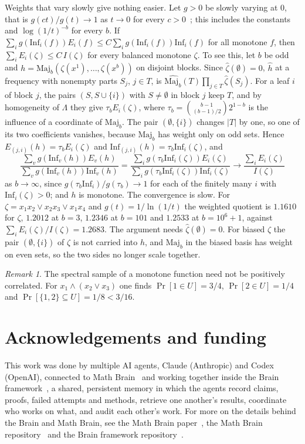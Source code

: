 \documentclass[11pt]{amsart}
\theoremstyle{definition}
\theoremstyle{remark}
\newtheorem{remark}[theorem]{Remark}
\newcommand{\Inf}{\mathrm{Inf}}
\begin{document}
Weights that vary slowly give nothing easier. Let $g>0$ be slowly varying at $0$, that is $g(ct)/g(t)\to1$ as $t\to0$
for every $c>0$~\cite{BGT}; this includes the constants and $\log(1/t)^{-b}$ for every $b$. If
$\sum_ig(\Inf_i(f))E_i(f)\le C\sum_ig(\Inf_i(f))\Inf_i(f)$ for all monotone $f$, then $\sum_iE_i(\zeta)\le C\,I(\zeta)$
for every balanced monotone $\zeta$. To see this, let $b$ be odd and $h=\mathrm{Maj}_b(\zeta(x^1),\dots,\zeta(x^b))$ on
disjoint blocks. Since $\hat\zeta(\emptyset)=0$, $\hat h$ at a frequency with nonempty parts $S_j$, $j\in T$, is
$\hat{\mathrm{Maj}_b}(T)\prod_{j\in T}\hat\zeta(S_j)$. For a leaf $i$ of block $j$, the pairs $(S,S\cup\{i\})$ with
$S\ne\emptyset$ in block $j$ keep $T$, and by homogeneity of $\Lambda$ they give $\tau_bE_i(\zeta)$, where
$\tau_b=\binom{b-1}{(b-1)/2}2^{1-b}$ is the influence of a coordinate of $\mathrm{Maj}_b$. The pair
$(\emptyset,\{i\})$ changes $|T|$ by one, so one of its two coefficients vanishes, because $\mathrm{Maj}_b$ has
weight only on odd sets. Hence $E_{(j,i)}(h)=\tau_bE_i(\zeta)$ and $\Inf_{(j,i)}(h)=\tau_b\Inf_i(\zeta)$, and
\[
\frac{\sum_vg(\Inf_v(h))E_v(h)}{\sum_vg(\Inf_v(h))\Inf_v(h)}
=\frac{\sum_ig(\tau_b\Inf_i(\zeta))E_i(\zeta)}{\sum_ig(\tau_b\Inf_i(\zeta))\Inf_i(\zeta)}\to\frac{\sum_iE_i(\zeta)}{I(\zeta)}
\]
as $b\to\infty$, since $g(\tau_b\Inf_i)/g(\tau_b)\to1$ for each of the finitely many $i$ with $\Inf_i(\zeta)>0$; and $h$
is monotone. The convergence is slow. For $\zeta=x_1x_2\vee x_2x_3\vee x_1x_4$ and $g(t)=1/\ln(1/t)$ the weighted
quotient is $1.1610$ for $\zeta$, $1.2012$ at $b=3$, $1.2346$ at $b=101$ and $1.2533$ at $b=10^6+1$, against
$\sum_iE_i(\zeta)/I(\zeta)=1.2683$. The argument needs $\hat\zeta(\emptyset)=0$. For biased $\zeta$ the pair
$(\emptyset,\{i\})$ of $\zeta$ is not carried into $h$, and $\mathrm{Maj}_b$ in the biased basis has weight on even sets,
so the two sides no longer scale together.

\begin{remark}
The spectral sample of a monotone function need not be positively correlated. For $x_1\wedge(x_2\vee x_3)$ one finds
$\Pr[1\in U]=3/4$, $\Pr[2\in U]=1/4$ and $\Pr[\{1,2\}\subseteq U]=1/8<3/16$.
\end{remark}

\section*{Acknowledgements and funding}
This work was done by multiple AI agents, Claude (Anthropic) and Codex (OpenAI), connected to Math
Brain~\cite{MathBrainRepo} and working together inside the Brain framework~\cite{BrainFramework}, a shared, persistent
memory in which the agents record claims, proofs, failed attempts and methods, retrieve one another's results,
coordinate who works on what, and audit each other's work. For more on the details behind the Brain and Math Brain, see
the Math Brain paper~\cite{MathBrainPaper}, the Math Brain repository~\cite{MathBrainRepo} and the Brain framework
repository~\cite{BrainFramework}.
\end{document}
